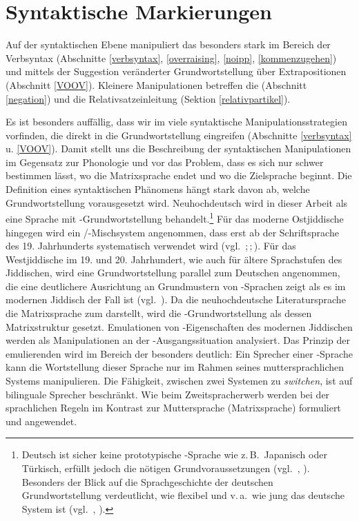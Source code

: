 \chapter{Syntaktische Markierungen}\label{syntax}

Auf der syntaktischen Ebene manipuliert das \hai{{\LiJi}} besonders stark im Bereich der Verbsyntax (Abschnitte \ref{verbsyntax}, \ref{overraising}, \ref{noipp}, \ref{kommenzugehen}) und mittels der Suggestion veränderter Grundwortstellung über Extrapositionen (Abschnitt \ref{VOOV}). Kleinere Manipulationen betreffen die  (Abschnitt \ref{negation}) und die Relativsatzeinleitung (Sektion \ref{relativpartikel}). 

Es ist besonders auffällig, dass wir im \hai{{\LiJi}} viele syntaktische Manipulationsstrategien vorfinden, die direkt in die Grundwortstellung eingreifen (Abschnitte \ref{verbsyntax} u. \ref{VOOV}). Damit stellt uns die Beschreibung der syntaktischen Manipulationen im Gegensatz zur Phonologie und  vor das Problem, dass es sich nur schwer bestimmen lässt, wo die Matrixsprache endet und wo die Zielsprache beginnt. Die \mbox{Definition} eines syntaktischen Phänomens hängt stark davon ab, welche Grundwortstellung vorausgesetzt wird. Neuhochdeutsch wird in dieser Arbeit als eine Sprache mit \hai{{\OV}}-Grundwortstellung behandelt.\footnote{Deutsch ist sicher keine prototypische \hai{{\OV}}-Sprache wie z.\,B.\, Japanisch oder Türkisch, erfüllt jedoch die nötigen Grundvoraussetzungen (vgl.\, \citealt{Vikner2001}, \citealt{Haider2010b}). Besonders der Blick auf die Sprachgeschichte der deutschen Grundwortstellung verdeutlicht, wie flexibel und v.\,a.\, wie jung das deutsche System ist (vgl.\, \citealt{Schallert2010}, \citealt{Haider2010}).} Für das moderne Ostjiddische hingegen wird ein \hai{{\OV}}/\hai{{\VO}}-Mischsystem angenommen, dass erst ab der Schriftsprache des 19. Jahrhunderts systematisch verwendet wird (vgl.\, \citealt{Santorini1989,Santorini1992,Santorini1993b,Santorini1993a,Santorini1994,Santorini1995};\,\citealt[203–207]{Krogh2007};\,\citealt[97–134]{Haider2013}). Für das Westjiddische im 19. und 20. Jahrhundert, wie auch für ältere Sprachstufen des Jiddischen, wird eine Grundwortstellung parallel zum Deutschen angenommen, die eine deutlichere Ausrichtung an Grundmustern von \hai{{\OV}}-Sprachen zeigt als es im modernen Jiddisch der Fall ist (vgl.\, \citealt{Santorini1989, Santorini1992, Santorini1993a, Santorini1993b, Santorini1994, Santorini1995}). Da die neuhochdeutsche Literatursprache die Matrixsprache zum \hai{{\LiJi}} darstellt, wird die \hai{{\OV}}-Grundwortstellung als dessen Matrixstruktur gesetzt. Emulationen von \hai{{\VO}}-Eigenschaften des modernen Jiddischen werden als Manipulationen an der \hai{{\OV}}-Ausgangssituation analysiert. Das Prinzip der emulierenden  wird im Bereich der  besonders deutlich: Ein Sprecher einer \hai{{\OV}}-Sprache kann die Wortstellung dieser Sprache nur im Rahmen seines muttersprachlichen Systems manipulieren. Die Fähigkeit, zwischen zwei Systemen zu \textit{switchen}, ist auf bilinguale Sprecher beschränkt. Wie beim Zweitspracherwerb werden bei der sprachlichen  Regeln im Kontrast zur Muttersprache (Matrixsprache) formuliert und angewendet. 
